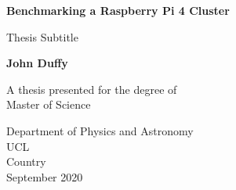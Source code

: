 \begin{titlepage}
   \begin{center}
       \vspace*{1cm}

       \textbf{Benchmarking a Raspberry Pi 4 Cluster}

       \vspace{0.5cm}
        Thesis Subtitle
            
       \vspace{1.5cm}

       \textbf{John Duffy}

       \vfill
            
       A thesis presented for the degree of\\
       Master of Science
            
       \vspace{0.8cm}
     
            
       Department of Physics and Astronomy\\
       UCL\\
       Country\\
       September 2020
            
   \end{center}
\end{titlepage}